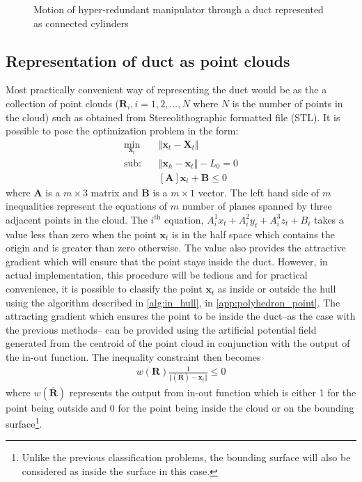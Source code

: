 \documentclass[12pt,a4]{article}
\begin{document}
\begin{figure}[ht!]
\begin{subfigure}{0.31\textwidth}
    \end{subfigure}%
    
    \caption{ Motion of hyper-redundant manipulator through a duct represented as connected cylinders}
\end{figure}


\subsection{Representation of duct as point clouds}
Most practically convenient way of representing the duct would be as the a collection of point clouds  ($\mathbf{R}_i,i=1,2,...,N$ where $N$ is the number of points in the cloud) such as obtained from Stereolithographic formatted file (STL). It is possible to pose the optimization problem in the form:
\begin{align}
\label{eq:STLeqs}
\min_{\textbf{x}_t} &\Vert \textbf{x}_t-\textbf{X}_t \Vert\\
\nonumber \text{sub:~~~} &\Vert \textbf{x}_h - \textbf{x}_t \Vert -L_0 = 0\\
&[\mathbf{A}]\mathbf{x}_t+\mathbf{B}\leq 0
\end{align}
where $\mathbf{A}$ is a $m\times 3$ matrix and $\mathbf{B}$ is a $m\times 1$ vector. The left hand side of $m$ inequalities represent the equations of $m$ number of planes spanned by three adjacent points in the cloud. The $i^\text{th}$ equation, $A_{i}^1x_t+A_{i}^2y_t+A_{i}^3z_t+B_i$ takes a value less than zero when the point $\mathbf{x}_t$ is in the half space which contains the origin and is greater than zero otherwise. The value also provides the attractive gradient which will ensure that the point stays inside the duct. However, in actual implementation, this procedure will be tedious and for practical convenience, it is possible to classify the point $\mathbf{x}_t$ as inside or outside the hull using the algorithm described in \cref{alg:in_hull}, in \cref{app:polyhedron_point}. The attracting gradient which ensures the point to be inside the duct--as the case with the previous methods-- can be provided using the artificial potential field generated from the centroid of the point cloud in conjunction with the output of the in-out function. The inequality constraint then becomes
\begin{align}
\label{eq:STLineq}
w(\mathbf{R})\frac{1}{\Vert(\overline{\mathbf{R}})-\mathbf{x}_t\Vert}\leq 0
\end{align}
where $w(\overline{\mathbf{R}})$ represents the output from in-out function which is either 1 for the point being outside and 0 for the point being inside the cloud or on the bounding surface\footnote{Unlike the previous classification problems, the bounding surface will also be considered as inside the surface in this case.}. 
\end{document}
